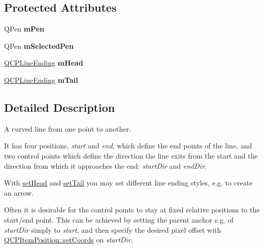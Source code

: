 \subsection*{\-Protected \-Attributes}
\begin{DoxyCompactItemize}
\item 
\hypertarget{classQCPItemCurve_a7ef92988d1db2e4d0311e34c0a57fe42}{\-Q\-Pen {\bfseries m\-Pen}}\label{classQCPItemCurve_a7ef92988d1db2e4d0311e34c0a57fe42}

\item 
\hypertarget{classQCPItemCurve_ab22cbab261b20be5aa8e4ca252149246}{\-Q\-Pen {\bfseries m\-Selected\-Pen}}\label{classQCPItemCurve_ab22cbab261b20be5aa8e4ca252149246}

\item 
\hypertarget{classQCPItemCurve_af2cc26ff199570940dc96f5ec19a13f8}{\hyperlink{classQCPLineEnding}{\-Q\-C\-P\-Line\-Ending} {\bfseries m\-Head}}\label{classQCPItemCurve_af2cc26ff199570940dc96f5ec19a13f8}

\item 
\hypertarget{classQCPItemCurve_af1dca285b97e3f5b892dab827a79f327}{\hyperlink{classQCPLineEnding}{\-Q\-C\-P\-Line\-Ending} {\bfseries m\-Tail}}\label{classQCPItemCurve_af1dca285b97e3f5b892dab827a79f327}

\end{DoxyCompactItemize}


\subsection{\-Detailed \-Description}
\-A curved line from one point to another. 

 \-It has four positions, {\itshape start\/} and {\itshape end\/}, which define the end points of the line, and two control points which define the direction the line exits from the start and the direction from which it approaches the end\-: {\itshape start\-Dir\/} and {\itshape end\-Dir\/}.

\-With \hyperlink{classQCPItemCurve_a08a30d9cdd63995deea3d9e20430676f}{set\-Head} and \hyperlink{classQCPItemCurve_ac3488d8b1a6489c845dc5bff3ef71124}{set\-Tail} you may set different line ending styles, e.\-g. to create an arrow.

\-Often it is desirable for the control points to stay at fixed relative positions to the start/end point. \-This can be achieved by setting the parent anchor e.\-g. of {\itshape start\-Dir\/} simply to {\itshape start\/}, and then specify the desired pixel offset with \hyperlink{classQCPItemPosition_aa988ba4e87ab684c9021017dcaba945f}{\-Q\-C\-P\-Item\-Position\-::set\-Coords} on {\itshape start\-Dir\/}. 

